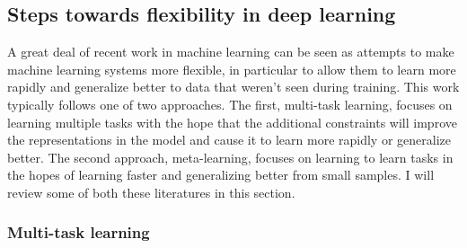 \documentclass[11pt]{article}
\begin{document}
\subsection{Steps towards flexibility in deep learning}

A great deal of recent work in machine learning can be seen as attempts to make machine learning systems more flexible, in particular to allow them to learn more rapidly and generalize better to data that weren't seen during training. This work typically follows one of two approaches. The first, multi-task learning, focuses on learning multiple tasks with the hope that the additional constraints will improve the representations in the model and cause it to learn more rapidly or generalize better. The second approach, meta-learning, focuses on learning to learn tasks in the hopes of learning faster and generalizing better from small samples. I will review some of both these literatures in this section. \par

\subsubsection{Multi-task learning}
\end{document}
